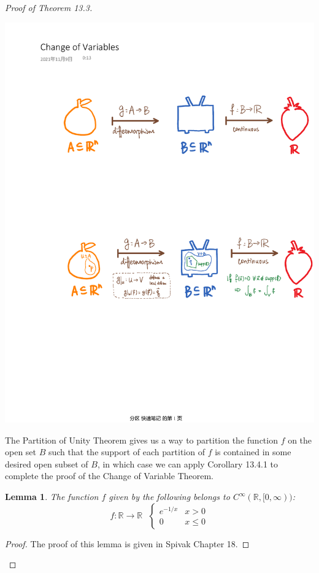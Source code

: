 \documentclass[15pt]{book}
\theoremstyle{break}
\theoremstyle{break}
\newtheorem{lem}{Lemma}[thm]
\newcommand{\R}{\mathbb{R}}
\begin{document}
\begin{proof}[Proof of Theorem 13.3]
\begin{center}
\includegraphics[scale=0.69]{cor13.4.pdf}
\end{center}

The Partition of Unity Theorem gives us a way to partition the function $f$ on the open set $B$ such that the support of each partition of $f$ is contained in some desired open subset of $B$, in which case we can apply Corollary 13.4.1 to complete the proof of the Change of Variable Theorem.

\begin{lem}
\setlength{\leftskip}{1cm}The function $f$ given by the following belongs to $C^\infty (\R,[0,\infty))$: $$f:\R \to \R \ \ \ \begin{cases}e^{-1/x} &x>0\\0&x\leq 0  \end{cases}$$
\end{lem}
\begin{proof}
\setlength{\leftskip}{1cm}The proof of this lemma is given in Spivak Chapter 18.
\end{proof}


\end{proof}
\end{document}
